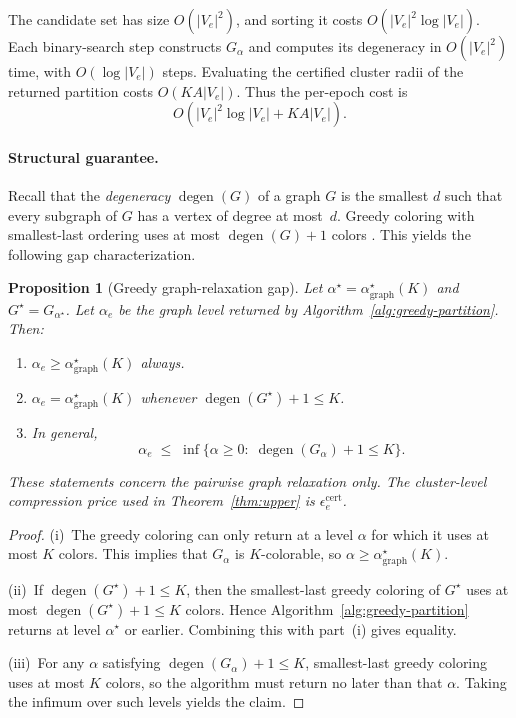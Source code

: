 \documentclass{article}
\DeclareMathOperator{\degen}{degen}
\theoremstyle{plain}
\newtheorem{proposition}{Proposition}
\theoremstyle{definition}
\theoremstyle{remark}
\newcommand{\eps}{\epsilon}
\begin{document}
The candidate set has size \(O(|V_e|^2)\), and sorting it costs
\(O(|V_e|^2\log |V_e|)\). Each binary-search step constructs \(G_\alpha\)
and computes its degeneracy in \(O(|V_e|^2)\) time, with
\(O(\log |V_e|)\) steps. Evaluating the certified cluster radii of the
returned partition costs \(O(KA|V_e|)\). Thus the per-epoch cost is
\[
O\!\left(|V_e|^2\log |V_e|+KA|V_e|\right).
\]

\paragraph{Structural guarantee.}
Recall that the \emph{degeneracy} $\degen(G)$ of a graph $G$ is the
smallest $d$ such that every subgraph of $G$ has a vertex of degree at
most~$d$.
Greedy coloring with smallest-last ordering uses at most
$\degen(G)+1$ colors \citep[see, e.g.,][]{matula1983smallest}.
This yields the following gap characterization.

\begin{proposition}[Greedy graph-relaxation gap]
\label{prop:greedy-gap}
Let \(\alpha^\star=\alpha^\star_{\mathrm{graph}}(K)\) and
\(G^\star=G_{\alpha^\star}\). Let \(\alpha_e\) be the graph level returned by
Algorithm~\ref{alg:greedy-partition}. Then:
\begin{enumerate}[label=(\roman*),nosep]
\item \(\alpha_e\ge \alpha^\star_{\mathrm{graph}}(K)\) always.
\item \(\alpha_e=\alpha^\star_{\mathrm{graph}}(K)\) whenever
  \(\degen(G^\star)+1\le K\).
\item In general,
  \begin{equation}
  \label{eq:greedy-gap}
  \alpha_e
  \;\le\;
  \inf\bigl\{
    \alpha\ge 0:\;\degen(G_\alpha)+1\le K
  \bigr\}.
  \end{equation}
\end{enumerate}
These statements concern the pairwise graph relaxation only. The
cluster-level compression price used in Theorem~\ref{thm:upper} is
\(\eps^{\mathrm{cert}}_e\).
\end{proposition}

\begin{proof}
(i)~The greedy coloring can only return at a level \(\alpha\) for which it
uses at most \(K\) colors. This implies that \(G_\alpha\) is \(K\)-colorable,
so \(\alpha\ge \alpha^\star_{\mathrm{graph}}(K)\).

(ii)~If \(\degen(G^\star)+1\le K\), then the smallest-last greedy coloring
of \(G^\star\) uses at most \(\degen(G^\star)+1\le K\) colors. Hence
Algorithm~\ref{alg:greedy-partition} returns at level \(\alpha^\star\) or
earlier. Combining this with part~(i) gives equality.

(iii)~For any \(\alpha\) satisfying \(\degen(G_\alpha)+1\le K\),
smallest-last greedy coloring uses at most \(K\) colors, so the algorithm
must return no later than that \(\alpha\). Taking the infimum over such
levels yields the claim.
\end{proof}
\end{document}
